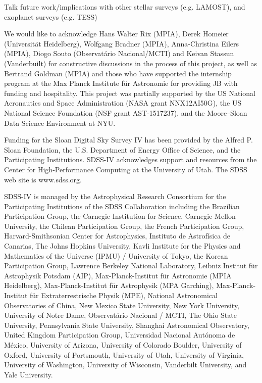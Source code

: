 \documentclass[twocolumn]{aastex62}
\begin{document}
Talk future work/implications with other stellar surveys (e.g. LAMOST), and exoplanet surveys (e.g. TESS)


\acknowledgements
We would like to acknowledge Hans Walter Rix (MPIA), Derek Homeier (Universit{\"a}t Heidelberg), Wolfgang Bradner (MPIA), Anna-Christina Eilers (MPIA), Diogo Souto (Observatário Nacional/MCTI) and Keivan Stassun (Vanderbuilt) for constructive discussions in the process of this project, as well as Bertrand Goldman (MPIA) and those who have supported the internship program at the Max Planck Institute f{\"u}r Astronomie for providing JB with funding and hospitality.
This project was partially supported by
the US National Aeronautics and Space Administration (NASA grant NNX12AI50G),
the US National Science Foundation (NSF grant AST-1517237),
and the Moore--Sloan Data Science Environment at NYU.

Funding for the Sloan Digital Sky Survey IV has been provided by the Alfred P. Sloan Foundation, the U.S. Department of Energy Office of Science, and the Participating Institutions. SDSS-IV acknowledges support and resources from the Center for High-Performance Computing at
the University of Utah. The SDSS web site is www.sdss.org.

SDSS-IV is managed by the Astrophysical Research Consortium for the 
Participating Institutions of the SDSS Collaboration including the 
Brazilian Participation Group, the Carnegie Institution for Science, 
Carnegie Mellon University, the Chilean Participation Group, the French Participation Group, Harvard-Smithsonian Center for Astrophysics, 
Instituto de Astrof\'isica de Canarias, The Johns Hopkins University, 
Kavli Institute for the Physics and Mathematics of the Universe (IPMU) / 
University of Tokyo, the Korean Participation Group, Lawrence Berkeley National Laboratory, 
Leibniz Institut f\"ur Astrophysik Potsdam (AIP),  
Max-Planck-Institut f\"ur Astronomie (MPIA Heidelberg), 
Max-Planck-Institut f\"ur Astrophysik (MPA Garching), 
Max-Planck-Institut f\"ur Extraterrestrische Physik (MPE), 
National Astronomical Observatories of China, New Mexico State University, 
New York University, University of Notre Dame, 
Observat\'ario Nacional / MCTI, The Ohio State University, 
Pennsylvania State University, Shanghai Astronomical Observatory, 
United Kingdom Participation Group,
Universidad Nacional Aut\'onoma de M\'exico, University of Arizona, 
University of Colorado Boulder, University of Oxford, University of Portsmouth, 
University of Utah, University of Virginia, University of Washington, University of Wisconsin, 
Vanderbilt University, and Yale University.
\end{document}
